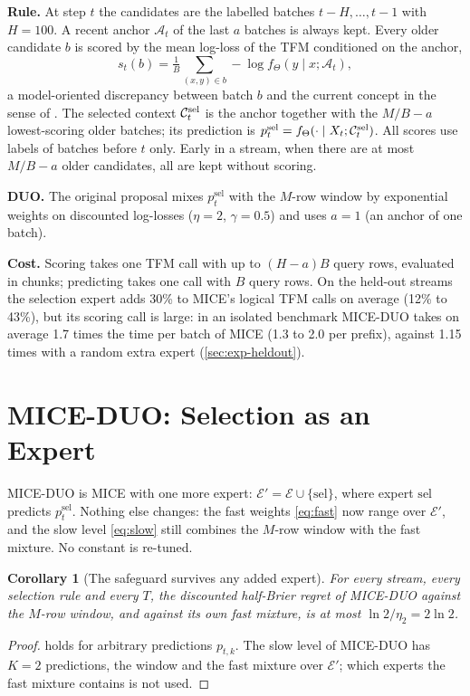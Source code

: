\documentclass{article}
\theoremstyle{plain}
\newtheorem{corollary}{Corollary}
\theoremstyle{definition}
\theoremstyle{remark}
\newcommand{\mice}{\textsc{MICE}}
\newcommand{\duo}{\textsc{DUO}}
\newcommand{\method}{\textsc{MICE-DUO}}
\newcommand{\sel}{\mathrm{sel}}
\begin{document}
\textbf{Rule.} At step $t$ the candidates are the labelled batches $t-H,\dots,t-1$ with $H=100$. A recent anchor
$\mathcal A_t$ of the last $a$ batches is always kept. Every older candidate $b$ is scored by the mean log-loss of
the TFM conditioned on the anchor,
\begin{equation}\label{eq:score}
  s_t(b)=\tfrac1B\textstyle\sum_{(x,y)\in b}-\log f_\Theta(y\mid x;\mathcal A_t),
\end{equation}
a model-oriented discrepancy between batch $b$ and the current concept in the sense of \citet{zhao2023rdiv}. The
selected context $\cC^{\sel}_t$ is the anchor together with the $M/B-a$ lowest-scoring older batches; its prediction
is $p^{\sel}_t=f_\Theta(\cdot\mid X_t;\cC^{\sel}_t)$. All scores use labels of batches before $t$ only. Early
in a stream, when there are at most $M/B-a$ older candidates, all are kept without scoring.

\textbf{\duo{}.} The original proposal mixes $p^{\sel}_t$ with the $M$-row window by exponential weights on
discounted log-losses ($\eta=2$, $\gamma=0.5$) and uses $a=1$ (an anchor of one batch).

\textbf{Cost.} Scoring takes one TFM call with up to $(H-a)B$ query rows, evaluated in chunks; predicting takes one
call with $B$ query rows. On the held-out streams the selection expert adds 30\% to \mice{}'s logical TFM calls on
average (12\% to 43\%), but its scoring call is large: in an isolated benchmark \method{} takes on average 1.7 times the
time per batch of \mice{} (1.3 to 2.0 per prefix), against 1.15 times with a random extra expert (\cref{sec:exp-heldout}).

\section{\method{}: Selection as an Expert}
\label{sec:method}

\method{} is \mice{} with one more expert: $\mathcal E'=\mathcal E\cup\{\sel\}$, where expert $\sel$ predicts
$p^{\sel}_t$. Nothing else changes: the fast weights \eqref{eq:fast} now range over $\mathcal E'$, and the slow level
\eqref{eq:slow} still combines the $M$-row window with the fast mixture. No constant is re-tuned.

\begin{corollary}[The safeguard survives any added expert]\label{cor:safe}
For every stream, every selection rule and every $T$, the discounted half-Brier regret of \method{} against the
$M$-row window, and against its own fast mixture, is at most $\ln 2/\eta_2=2\ln2$.
\end{corollary}
\begin{proof}
 holds for arbitrary predictions $p_{t,k}$. The slow level of \method{} has $K=2$ predictions, the
window and the fast mixture over $\mathcal E'$; which experts the fast mixture contains is not used.
\end{proof}
\end{document}
